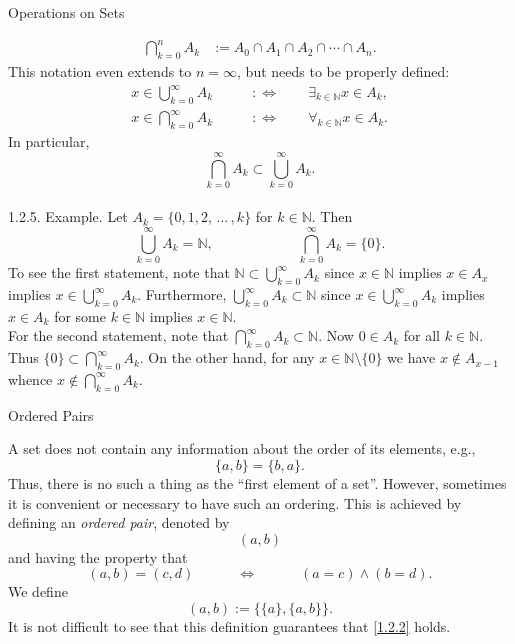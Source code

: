 \documentclass[smaller,hyperref={CJKbookmarks=true}]{beamer}
\newcommand{\N}{\mathbb{N}} \newcommand{\Z}{\mathbb{Z}} \newcommand{\Q}{\mathbb{Q}}
\begin{document}
\begin{frame}{Operations on Sets}
\begin{spacing}{1.00}
\begin{align*}
  \bigcap_{k=0}^n A_k &:=A_0\cap A_1\cap A_2\cap\cdots\cap A_n.
\end{align*}
This notation even extends to $n=\infty$, but needs to be properly defined:
\begin{align*}
  x\in\bigcup_{k=0}^{\infty}A_k\qquad &:\Leftrightarrow\qquad\mathop{\exists}_{k\in\N}x\in A_k, \\
  x\in\bigcap_{k=0}^{\infty}A_k\qquad  &:\Leftrightarrow\qquad\mathop{\forall}_{k\in\N}x\in A_k.
\end{align*}
\newpage
In particular,
\[\bigcap_{k=0}^{\infty}A_k\subset\bigcup_{k=0}^{\infty}A_k.\]
 \\[5pt]
\alert{1.2.5. Example.} Let $A_k=\{0,1,2,\,...\,,k\}$ for $k\in\N$. Then
\[\bigcup_{k=0}^{\infty}A_k=\N,\qquad\qquad\qquad
\bigcap_{k=0}^{\infty}A_k=\{0\}.\]
To see the first statement, note that $\N\subset\bigcup_{k=0}^{\infty}A_k$ since $x\in\N$ implies $x\in A_x$ implies $x\in\bigcup_{k=0}^{\infty}A_k$. Furthermore, $\bigcup_{k=0}^{\infty}A_k\subset\N$ since $x\in\bigcup_{k=0}^{\infty}A_k$ implies $x\in A_k$ for some $k\in\N$ implies $x\in\N$.\\[4pt]
For the second statement, note that $\bigcap_{k=0}^{\infty}A_k\subset\N$. Now $0\in A_k$ for all $k\in\N$. Thus $\{0\}\subset\bigcap_{k=0}^{\infty}A_k$. On the other hand, for any $x\in\N\setminus\{0\}$ we have $x\notin A_{x-1}$ whence $x\notin\bigcap_{k=0}^{\infty}A_k$.
\end{spacing}
\end{frame}
\begin{frame}[t]{Ordered Pairs}
\begin{spacing}{1.05}
A set does not contain any information about the order of its elements,
e.g.,
\[\{a,b\}=\{b,a\}.\]
Thus, there is no such a thing as the ``first element of a set''. However,
sometimes it is convenient or necessary to have such an ordering. This is
achieved by defining an \emph{ordered pair}, denoted by
\[(a,b)\]
and having the property that
\begin{equation}\label{1.2.2}
  (a,b)=(c,d)\qquad\quad\Leftrightarrow\qquad\quad
  (a=c)\wedge(b=d).
\end{equation}
We define
\[(a,b):=\{\{a\},\{a,b\}\}.\]
It is not difficult to see that this definition guarantees that \eqref{1.2.2} holds.
\end{spacing}
\end{frame}
\end{document}
